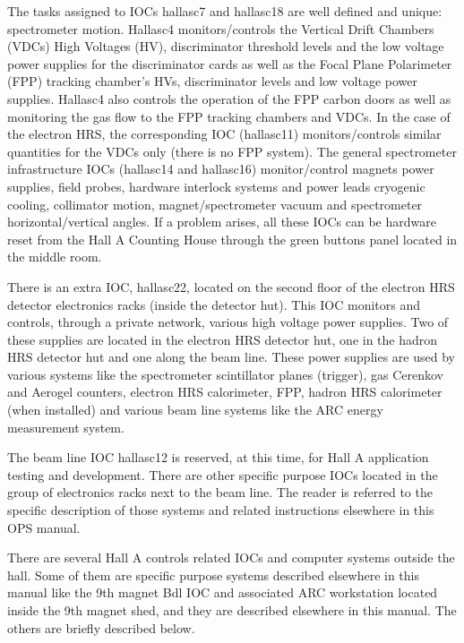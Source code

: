 The tasks assigned to IOCs hallasc7 and hallasc18 are well defined and unique: spectrometer motion.
Hallasc4 monitors/controls the Vertical Drift Chambers (VDCs) 
High Voltages (HV), discriminator threshold levels and the
low voltage power supplies for the discriminator cards as well as the Focal Plane Polarimeter
(FPP) tracking chamber's HVs, discriminator levels and 
low voltage power supplies.
Hallasc4 also controls the operation of the FPP carbon doors as
well as monitoring the gas flow to the FPP tracking
chambers and VDCs. In the case of the electron HRS, the corresponding IOC (hallasc11) monitors/controls similar quantities
for the VDCs only (there is no FPP system). The general spectrometer infrastructure IOCs (hallasc14 and hallasc16) monitor/control
magnets power supplies, field probes, hardware interlock systems and power leads cryogenic cooling, collimator motion,
magnet/spectrometer vacuum and spectrometer horizontal/vertical angles. If a problem arises, all these IOCs can be hardware
reset from the Hall A Counting House through the green buttons panel located in the middle room.

There is an extra IOC, hallasc22, located on the second floor of the electron HRS detector electronics racks 
(inside the detector hut). This IOC monitors and controls, through
a private network, various high voltage power supplies. Two of these supplies are located in the electron
HRS detector hut, one in the hadron HRS detector hut and one along the beam line. These power supplies are used by
various systems like the spectrometer scintillator planes (trigger), gas Cerenkov and Aerogel counters, electron HRS calorimeter,
FPP, hadron HRS calorimeter (when installed) and various
beam line systems like the ARC energy measurement system.

The beam line IOC hallasc12 is reserved, at this time, for Hall A application testing and development. There are other specific
purpose IOCs located in the group of electronics racks next to the beam line. The reader is referred to the specific description
of those systems and related instructions elsewhere in this OPS manual.

There are several Hall A controls related IOCs and computer systems outside the hall. Some of them are specific purpose
systems described elsewhere in this manual like the 9th magnet Bdl IOC and associated ARC workstation located inside the 9th magnet
shed, and they are described elsewhere in this manual. The others are briefly described below. 

